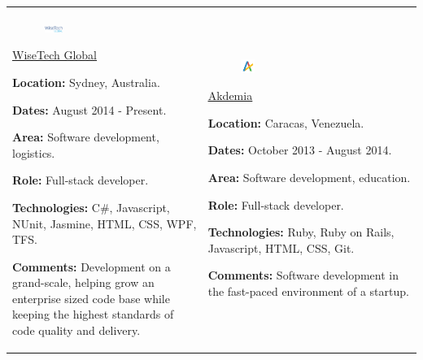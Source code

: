 \documentclass[10pt]{article}
\begin{document}
\begin{tabular}[t]{ll}
	\parbox{0.45\textwidth}
	{
		\begin{figure}
			\includegraphics[width=0.15\textwidth]{wtg}
		\end{figure}

		\begin{center}
			\underline{\href{https://http://www.wisetechglobal.com/}{WiseTech Global}}
		\end{center}

		\textbf{Location:} Sydney, Australia.

		\textbf{Dates:} August 2014 - Present.
	
		\textbf{Area:} Software development, logistics.
	
		\textbf{Role:} Full-stack developer.
	
		\textbf{Technologies:} C\#, Javascript, NUnit, Jasmine, HTML, CSS, WPF, TFS.
	
		\textbf{Comments:} Development on a grand-scale, helping grow an enterprise sized code base while keeping the highest standards of code quality and delivery.
	}

	&

	\parbox{0.45\textwidth}
	{
		\begin{figure}
			\includegraphics[width=0.10\textwidth]{akdemia}
		\end{figure}

		\begin{center}
			\underline{\href{https://www.akdemia.com}{Akdemia}}
		\end{center}

		\textbf{Location:} Caracas, Venezuela.

		\textbf{Dates:} October 2013 - August 2014.
	
		\textbf{Area:} Software development, education.
	
		\textbf{Role:} Full-stack developer.
	
		\textbf{Technologies:} Ruby, Ruby on Rails, Javascript, HTML, CSS, Git.
	
		\textbf{Comments:} Software development in the fast-paced environment of a startup.
	}


\end{tabular}
\end{document}
